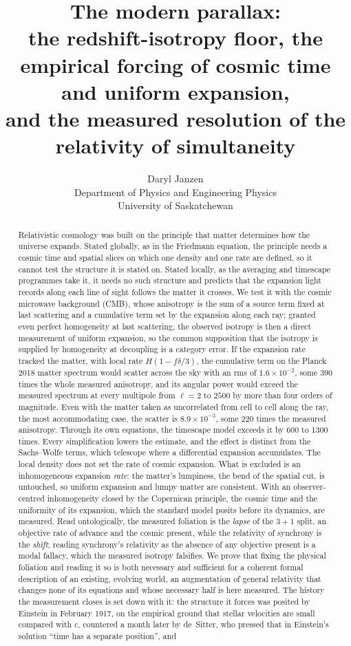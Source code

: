 \documentclass[11pt,a4paper]{article}
\title{The modern parallax:\\
\large the redshift-isotropy floor, the empirical forcing of cosmic time and uniform expansion,\\
and the measured resolution of the relativity of simultaneity}
\author{Daryl Janzen\\
\small Department of Physics and Engineering Physics\\
\small University of Saskatchewan}
\date{}
\begin{document}
\maketitle

\begin{abstract}
Relativistic cosmology was built on the principle that matter determines how the universe expands. Stated globally, as in the Friedmann equation, the principle needs a cosmic time and spatial slices on which one density and one rate are defined, so it cannot test the structure it is stated on. Stated locally, as the averaging and timescape programmes take it, it needs no such structure and predicts that the expansion light records along each line of sight follows the matter it crosses. We test it with the cosmic microwave background (CMB), whose anisotropy is the sum of a source term fixed at last scattering and a cumulative term set by the expansion along each ray; granted even perfect homogeneity at last scattering, the observed isotropy is then a direct measurement of uniform expansion, so the common supposition that the isotropy is supplied by homogeneity at decoupling is a category error. If the expansion rate tracked the matter, with local rate $H(1-f\delta/3)$, the cumulative term on the Planck 2018 matter spectrum would scatter across the sky with an rms of $1.6\times10^{-2}$, some 390 times the whole measured anisotropy, and its angular power would exceed the measured spectrum at every multipole from $\ell=2$ to $2500$ by more than four orders of magnitude. Even with the matter taken as uncorrelated from cell to cell along the ray, the most accommodating case, the scatter is $8.9\times10^{-3}$, some 220 times the measured anisotropy. Through its own equations, the timescape model exceeds it by 600 to 1300 times. Every simplification lowers the estimate, and the effect is distinct from the Sachs--Wolfe terms, which telescope where a differential expansion accumulates. The local density does not set the rate of cosmic expansion. What is excluded is an inhomogeneous expansion \emph{rate}: the matter's lumpiness, the bend of the spatial cut, is untouched, so uniform expansion and lumpy matter are consistent. With an observer-centred inhomogeneity closed by the Copernican principle, the cosmic time and the uniformity of its expansion, which the standard model posits before its dynamics, are measured. Read ontologically, the measured foliation is the \emph{lapse} of the $3{+}1$ split, an objective rate of advance and the cosmic present, while the relativity of synchrony is the \emph{shift}; reading synchrony's relativity as the absence of any objective present is a modal fallacy, which the measured isotropy falsifies. We prove that fixing the physical foliation and reading it so is both necessary and sufficient for a coherent formal description of an existing, evolving world, an augmentation of general relativity that changes none of its equations and whose necessary half is here measured. The history the measurement closes is set down with it: the structure it forces was posited by Einstein in February 1917, on the empirical ground that stellar velocities are small compared with $c$, countered a month later by de~Sitter, who pressed that in Einstein's solution ``time has a separate position'', and 
\end{abstract}
\end{document}
